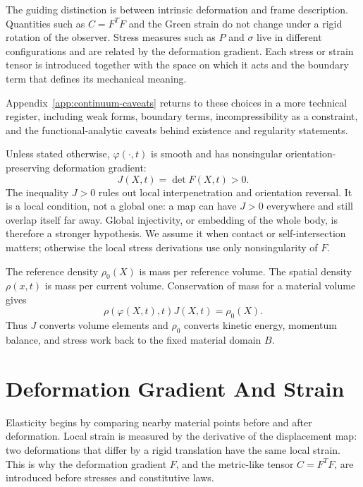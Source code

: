 The guiding distinction is between intrinsic deformation and frame description.
Quantities such as \(C=F^TF\) and the Green strain do not change under a rigid
rotation of the observer. Stress measures such as \(P\) and \(\sigma\) live in
different configurations and are related by the deformation gradient.  Each
stress or strain tensor is introduced together with the space on which it acts
and the boundary term that defines its mechanical meaning.

Appendix~\ref{app:continuum-caveats} returns to these choices in a more
technical register, including weak forms, boundary terms, incompressibility as
a constraint, and the functional-analytic caveats behind existence and
regularity statements.

\begin{hypothesis}
Unless stated otherwise, \(\varphi(\cdot,t)\) is smooth and has nonsingular
orientation-preserving deformation gradient:
\[
  J(X,t)=\det F(X,t)>0.
\]
The inequality \(J>0\) rules out local interpenetration and orientation
reversal. It is a local condition, not a global one: a map can have \(J>0\)
everywhere and still overlap itself far away. Global injectivity, or embedding
of the whole body, is therefore a stronger hypothesis. We assume it when contact
or self-intersection matters; otherwise the local stress derivations use only
nonsingularity of \(F\).
\end{hypothesis}

\begin{definition}
The reference density \(\rho_0(X)\) is mass per reference volume. The spatial
density \(\rho(x,t)\) is mass per current volume. Conservation of mass for a
material volume gives
\[
  \rho(\varphi(X,t),t)J(X,t)=\rho_0(X).
\]
Thus \(J\) converts volume elements and \(\rho_0\) converts kinetic energy,
momentum balance, and stress work back to the fixed material domain \(B\).
\end{definition}

\section{Deformation Gradient And Strain}
\label{sec:deformation-gradient-strain}

Elasticity begins by comparing nearby material points before and after
deformation. Local strain is measured by the derivative of the displacement
map: two deformations that differ by a rigid translation have the same local
strain. This is why the deformation gradient \(F\), and the metric-like tensor
\(C=F^TF\), are introduced before stresses and constitutive laws.

